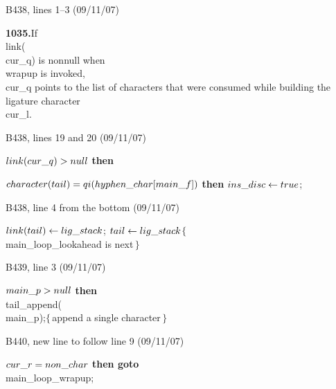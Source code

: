 {{\bugonpage B438, lines 1--3 (09/11/07)

\tenpoint\noindent
{\bf1035.\quad}If \\{link}(\\{cur\_q}) is nonnull when \\{wrapup} is invoked,
\\{cur\_q} points to
the list of characters that were consumed while building the ligature
character~\\{cur\_l}.

\bugonpage B438, lines 19 and 20 (09/11/07)

\ninepoint\noindent
\qquad\qquad{} $\\{link}(\\{cur\_q})>\\{null}$ {\bf then}
\par\noindent
\qquad\qquad\qquad{} $\\{character}(\\{tail})=\\{qi}(
  \\{hyphen\_char}[\\{main\_f}])$ {\bf then} $\\{ins\_disc}\gets\\{true}$;

\bugonpage B438, line 4 from the bottom (09/11/07)

\ninepoint\noindent
\quad$\\{link}(\\{tail})\gets\\{lig\_stack}$;
$\\{tail}\gets\\{lig\_stack}$\quad$\{\,$\\{main\_loop\_lookahead} is next$\,\}$

\bugonpage B439, line 3 (09/11/07)

\ninepoint\noindent
{} $\\{main\_p}>\\{null}$ {\bf then}
 \\{tail\_append}(\\{main\_p});\quad$\{\,$append a single character$\,\}$

\bugonpage B440, new line to follow line 9 (09/11/07)

\ninepoint\noindent
{} $\\{cur\_r}=\\{non\_char}$ {\bf then goto}
 \\{main\_loop\_wrapup};

}}
